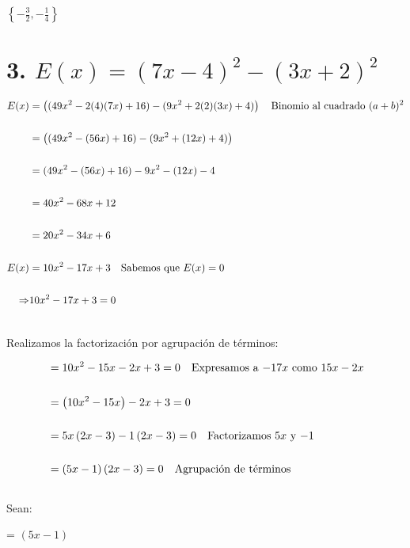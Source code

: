 \documentclass[12pt]{article}
\begin{document}
{}

\begin{center}
   
  $\left\{-\frac{3}{2},-\frac{1}{4}\right\}$ 
   
\end{center}

\newpage

\section*{3. $E(x) = (7x-4)^{2}-(3x+2)^{2}$}

{}

\begin{equation*}
    \begin{split}
      E(x) & = \left((49x^{2} - 2(4)(7x) + 16) - (9x^{2} + 2(2)(3x) + 4)\right)  \quad \textup{Binomio al cuadrado $(a+b)^{2}$} \\\\
      & = \left((49x^{2} - (56x) + 16) - (9x^{2} +(12x) + 4)\right) \\\\
      & =  (49x^{2} - (56x) + 16) - 9x^{2} -(12x) - 4 \\\\
      & = 40x^{2} -68x + 12\\\\
      & = 20x^{2} -34x + 6\\\\
      E(x) & =10x^{2} -17x + 3 \quad \textup{Sabemos que $E(x)= 0$} \\\\
      \Rightarrow  &  10x^{2} -17x + 3 = 0\\\\
    \end{split}
\end{equation*}

Realizamos la factorización por agrupación de términos:

\begin{equation*}
    \begin{split}
       & = 10x^{2}-15x-2x+3 = 0 \quad \textup{Expresamos a $-17x$ como $15x -2x$} \\\\
      & = \left(10x^{2}-15x\right)-2x+3 = 0 \\\\
      & = 5x\left(2x-3\right)-1\left(2x-3\right) = 0 \quad \textup{Factorizamos $5x$ y $-1$} \\\\
       & = \left(5x-1\right)\left(2x-3\right) = 0 \quad \textup{Agrupación de términos}\\\\
    \end{split}
\end{equation*}
Sean: 
\begin{center}
   {} = $\left(5x-1\right)$   
\end{center}
\end{document}
